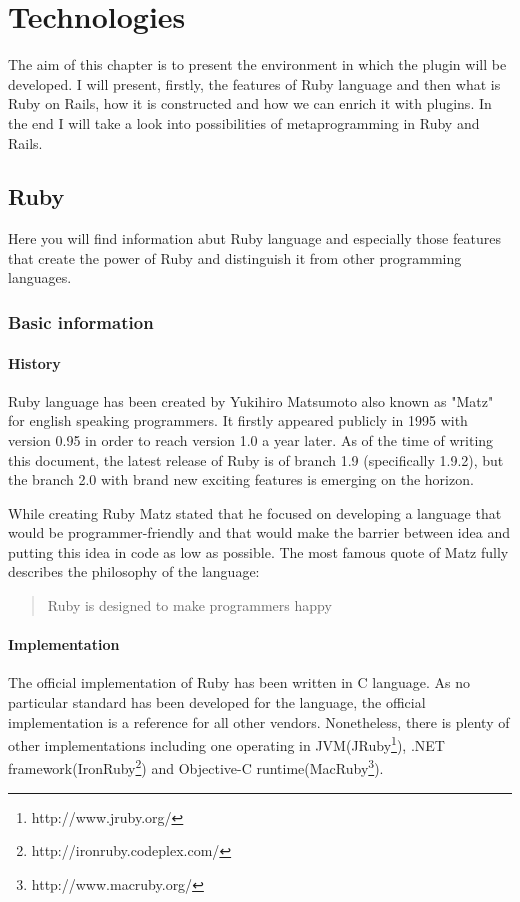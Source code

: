 \nocite{ruby02}
\nocite{ruby03}
\nocite{ruby_doc}
\chapter{Technologies}
  The aim of this chapter is to present the environment in which the plugin will be developed. I will present, firstly, the features of Ruby language and then what is Ruby on Rails, how it is constructed and how we can enrich it with plugins. In the end I will take a look into possibilities of metaprogramming in Ruby and Rails.
  
  \section{Ruby}
  Here you will find information abut Ruby language and especially those features that create the power of Ruby and distinguish it from other programming languages.
    \subsection{Basic information}
      \subsubsection{History}
      Ruby language has been created by Yukihiro Matsumoto also known as "Matz" for english speaking programmers. It firstly appeared publicly in 1995 with version 0.95 in order to reach version 1.0 a year later. As of the time of writing this document, the latest release of Ruby is of branch 1.9 (specifically 1.9.2), but the branch 2.0 with brand new exciting features is emerging on the horizon.
    
      While creating Ruby Matz stated that he focused on developing a language that would be programmer-friendly and that would make the barrier between idea and putting this idea in code as low as possible. The most famous quote of Matz fully describes the philosophy of the language:
    
      \begin{quote}
        Ruby is designed to make programmers happy
      \end{quote}
        
      \subsubsection{Implementation}
      The official implementation of Ruby has been written in C language. As no particular standard has been developed for the language, the official implementation is a reference for all other vendors. Nonetheless, there is plenty of other implementations including one operating in JVM(JRuby\footnote{http://www.jruby.org/}), .NET framework(IronRuby\footnote{http://ironruby.codeplex.com/}) and Objective-C runtime(MacRuby\footnote{http://www.macruby.org/}).
    
